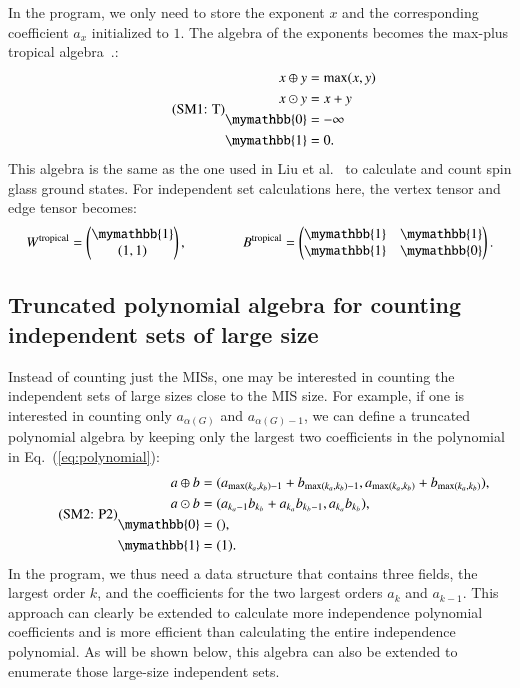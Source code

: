 \documentclass[onefignum, onetabnum]{siamart190516}
\newcommand{\eqname}[1]{\stepcounter{equation}\tag{\theequation : #1}}
\newcommand{\<}{\langle}
\renewcommand{\>}{\rangle}
\newcommand{\Eq}[1]{Eq.~(\ref{#1})}
\newcounter{example}
\begin{document}
In the program, we only need to store the exponent $x$ and the corresponding coefficient $a_x$ initialized to $1$. 
The algebra of the exponents becomes the max-plus tropical algebra~\cite{Maclagan2015, Moore2011}.:
\begin{equation}\eqname{T}
    \begin{split}
        x \oplus y &= \max(x,y)\\
        x \odot y &= x + y\\
        \mymathbb{0} &= -\infty\\
        \mymathbb{1} &= 0.
    \end{split}\label{eq:tropical}
\end{equation}
This algebra is the same as the one used in Liu et al.~\cite{Liu2021} to calculate and count spin glass ground states.
For independent set calculations here, the vertex tensor and edge tensor becomes:
\begin{equation}
    W^{\rm tropical} = \left(\begin{matrix}
        \mymathbb{1} \\
        (1,1)
    \end{matrix}\right),   
    \qquad \qquad
        B^{\rm tropical} = \left(\begin{matrix}
        \mymathbb{1}  & \mymathbb{1} \\
        \mymathbb{1} & \mymathbb{0}
    \end{matrix}\right).
\end{equation}

\subsection{Truncated polynomial algebra for counting independent sets of large size}
Instead of counting just the MISs, one may be interested in counting the independent sets of large sizes close to the MIS size.
For example, if one is interested in counting only $a_{\alpha(G)}$ and $a_{\alpha(G)-1}$, we can define a truncated polynomial algebra by keeping only the largest two coefficients in the polynomial in \Eq{eq:polynomial}:
\begin{equation}
    \eqname{P2}
    \begin{split}
    a \oplus b &= (a_{\max(k_a, k_b)-1} + b_{\max(k_a, k_b)-1}, a_{\max(k_a, k_b)} + b_{\max(k_a, k_b)}),\\
    a \odot b &= (a_{k_a-1} b_{k_b}+a_{k_a} b_{k_b-1}, a_{k_a} b_{k_b}),\\
    \mymathbb{0} &= (), \\
    \mymathbb{1} &= (1).\label{eq:max2poly}
    \end{split}
\end{equation}
In the program, we thus need a data structure that contains three fields, the largest order $k$, and the coefficients for the two largest orders $a_k$ and $a_{k-1}$.
This approach can clearly be extended to calculate more independence polynomial coefficients and is more efficient than calculating the entire independence polynomial.
As will be shown below, this algebra can also be extended to enumerate those large-size independent sets.
\end{document}
